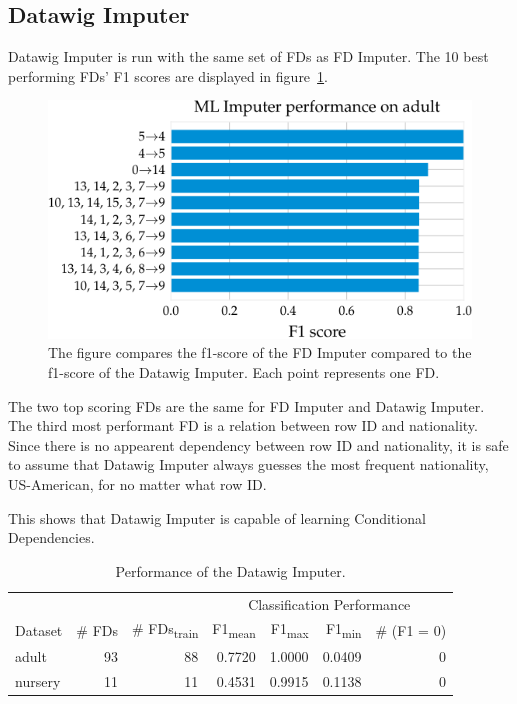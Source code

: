 \subsection{Datawig Imputer}
Datawig Imputer is run with the same set of FDs as FD Imputer.
The 10 best performing FDs' F1 scores are displayed in figure~\ref{fig:f1_ml_adult}.
\begin{figure}[ht]
     \centering
     \includegraphics[width=.8\textwidth]{../figures/adult/f1_ml_imputer_adult.pdf}
     \caption{The figure compares the f1-score of the FD Imputer compared to the f1-score of the Datawig Imputer. Each point represents one FD.}
     \label{fig:f1_ml_adult}
 \end{figure}
The two top scoring FDs are the same for FD Imputer and Datawig Imputer.
The third most performant FD is a relation between row ID and nationality.
Since there is no appearent dependency between row ID and nationality, it is safe to assume that Datawig Imputer always guesses the most frequent nationality, US-American, for no matter what row ID.

This shows that Datawig Imputer is capable of learning Conditional Dependencies.

\begin{table}[ht]
    \centering
    \begin{tabular}{lrrrrrr}
        \toprule
        & & & \multicolumn{4}{c}{Classification Performance} \\
        \cmidrule(lr{.25em}){4-7}
        Dataset & \# FDs & \# FDs\textsubscript{train} & F1\textsubscript{mean} & F1\textsubscript{max} & F1\textsubscript{min} & \# (F1 = 0) \\
        \midrule
        adult & 93 & 88 & 0.7720 & 1.0000 & 0.0409 & 0 \\
        nursery & 11 & 11 & 0.4531 & 0.9915 & 0.1138 & 0 \\
        \bottomrule
    \end{tabular}
    \caption{Performance of the Datawig Imputer.}\label{tab:ml-imputer-performance}
\end{table}

